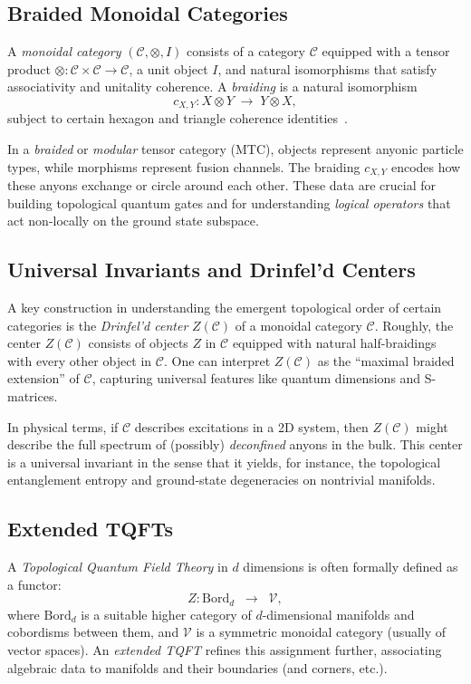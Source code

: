 \documentclass[12pt]{article}
\begin{document}
\subsection{Braided Monoidal Categories}
A \emph{monoidal category} $(\mathcal{C}, \otimes, I)$ consists of a category $\mathcal{C}$ equipped with a tensor product $\otimes: \mathcal{C}\times\mathcal{C}\to \mathcal{C}$, a unit object $I$, and natural isomorphisms that satisfy associativity and unitality coherence. A \emph{braiding} is a natural isomorphism
\[
c_{X,Y}:X\otimes Y \; \longrightarrow \; Y\otimes X,
\]
subject to certain hexagon and triangle coherence identities~\cite{kassel2008quantum}.

In a \emph{braided} or \emph{modular} tensor category (MTC), objects represent anyonic particle types, while morphisms represent fusion channels. The braiding $c_{X,Y}$ encodes how these anyons exchange or circle around each other. These data are crucial for building topological quantum gates and for understanding \emph{logical operators} that act non-locally on the ground state subspace.

\subsection{Universal Invariants and Drinfel’d Centers}
A key construction in understanding the emergent topological order of certain categories is the \emph{Drinfel’d center} $Z(\mathcal{C})$ of a monoidal category $\mathcal{C}$. Roughly, the center $Z(\mathcal{C})$ consists of objects $Z$ in $\mathcal{C}$ equipped with natural half-braidings with every other object in $\mathcal{C}$. One can interpret $Z(\mathcal{C})$ as the “maximal braided extension” of $\mathcal{C}$, capturing universal features like quantum dimensions and S-matrices.

In physical terms, if $\mathcal{C}$ describes excitations in a 2D system, then $Z(\mathcal{C})$ might describe the full spectrum of (possibly) \emph{deconfined} anyons in the bulk. This center is a universal invariant in the sense that it yields, for instance, the topological entanglement entropy and ground-state degeneracies on nontrivial manifolds.

\subsection{Extended TQFTs}
A \emph{Topological Quantum Field Theory} in $d$ dimensions is often formally defined as a functor:
\[
Z: \mathrm{Bord}_d \;\; \longrightarrow \;\; \mathcal{V},
\]
where $\mathrm{Bord}_d$ is a suitable higher category of $d$-dimensional manifolds and cobordisms between them, and $\mathcal{V}$ is a symmetric monoidal category (usually of vector spaces). An \emph{extended TQFT} refines this assignment further, associating algebraic data to manifolds and their boundaries (and corners, etc.).
\end{document}
